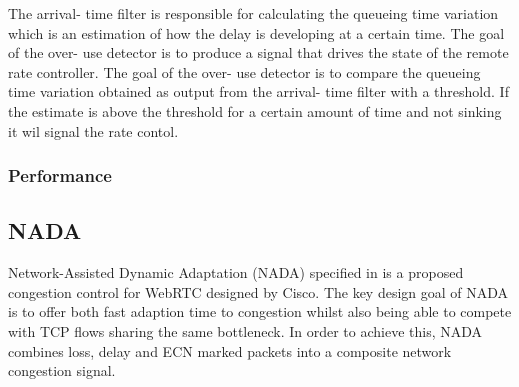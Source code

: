 \documentclass[UKenglish]{ifimaster}
\begin{document}
The arrival- time filter is responsible for calculating the queueing time variation which is an estimation of how the delay is developing at a certain time.
The goal of the over- use detector is to produce a signal that drives the state of the remote rate controller. 
The goal of the over- use detector is to compare the queueing time variation obtained as output from the arrival- time filter with a threshold. If the estimate is above the threshold for a certain amount of time and not sinking it wil signal the rate contol.
\subsubsection{Performance}
\subsection{NADA}
Network-Assisted Dynamic Adaptation (NADA) \cite{XiaoqingZhu2013NAUC} specified in \cite{rfc8698} is a proposed congestion control for WebRTC designed by Cisco.
The key design goal of NADA is to offer both fast adaption time to congestion whilst also being able to compete with TCP flows sharing the same bottleneck.
In order to achieve this, NADA combines loss, delay and ECN marked packets into a composite network congestion signal.
\end{document}
